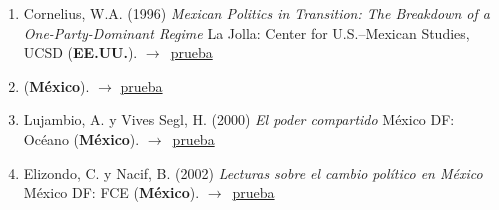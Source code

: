 \documentclass[12 pt, letter]{article}
\newenvironment{CitasMiTrabajo}{
    \begin{footnotesize}
    \begin{enumerate}[label={\footnotesize\emph{cita~\arabic*}},ref=\arabic*] %
        \setlength{\itemsep}{.1\itemsep}
        \setlength{\parskip}{.1\parskip}
    }{\end{enumerate}\end{footnotesize}}
\begin{document}

        \begin{CitasMiTrabajo}

        \item Cornelius, W.A. (1996)
        \emph{Mexican Politics in Transition: The Breakdown of a One-Party-Dominant Regime}
        La Jolla: Center for U.S.--Mexican Studies, UCSD (\textbf{EE.UU.}). $\rightarrow$~\href{https://github.com/emagar/cv/blob/master/citasMiTrab/tesisItam/corneliusMPIT.pdf}{prueba}

        \item {} (\textbf{M\'exico}). $\rightarrow$ \href{https://github.com/emagar/cv/blob/master/citasMiTrab/tesisItam/deremesYuxtap1999pyg.pdf}{prueba}

        \item Lujambio, A. y Vives Segl, H. (2000)
        \emph{El poder compartido}
        M\'exico DF: Oc\'eano (\textbf{M\'exico}). $\rightarrow$~\href{https://github.com/emagar/cv/blob/master/citasMiTrab/tesisItam/LujambioVivesPC.pdf}{prueba}

        \item Elizondo, C. y Nacif, B. (2002)
        \emph{Lecturas sobre el cambio pol\'itico en M\'exico}
        M\'exico DF: FCE (\textbf{M\'exico}). $\rightarrow$~\href{https://github.com/emagar/cv/blob/master/citasMiTrab/tesisItam/elizNacif.pdf}{prueba}


        \label{ncites:magar.1994} %

        \end{CitasMiTrabajo}
\end{document}

